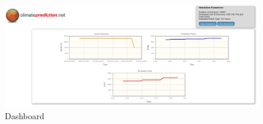 \documentclass[journal abbreviation, manuscript]{copernicus}
\providecommand{\DIFaddbeginFL}{} %
\providecommand{\DIFaddendFL}{} %
\providecommand{\DIFdelbeginFL}{} %
\providecommand{\DIFdelendFL}{} %
\begin{document}
\begin{figure}[!h]
\centering
\DIFdelbeginFL %
\DIFdelendFL \DIFaddbeginFL \includegraphics[width=6.5in]{images/screenshots/gui/dashboard01}
\DIFaddendFL \caption{Dashboard}
\label{fig:dashboard}
\end{figure}
\end{document}

